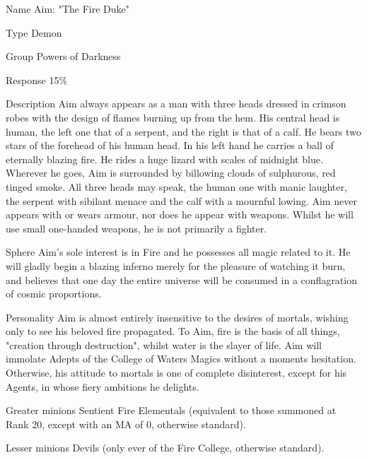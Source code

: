 \begin{example}
\begin{Description}
\item[Name] Aim: "The Fire Duke"

\item[Type] Demon

\item[Group] Powers of Darkness

\item[Response] 15\%

\item[Description] Aim always appears as a man with three heads dressed
in crimson robes with the design of flames burning up from the hem.
His central head is human, the left one that of a serpent, and the
right is that of a calf.  He bears two stars of the forehead of his
human head.  In his left hand he carries a ball of eternally blazing
fire.  He rides a huge lizard with scales of midnight blue.  Wherever
he goes, Aim is surrounded by billowing clouds of sulphurous, red
tinged smoke.  All three heads may speak, the human one with manic
laughter, the serpent with sibilant menace and the calf with a
mournful lowing.  Aim never appears with or wears armour, nor does he
appear with weapons.  Whilst he will use small one-handed weapons, he
is not primarily a fighter.

\item[Sphere] Aim's sole interest is in Fire and he possesses all magic
related to it.  He will gladly begin a blazing inferno merely for the
pleasure of watching it burn, and believes that one day the entire
universe will be consumed in a conflagration of cosmic proportions.

\item[Personality] Aim is almost entirely insensitive to the desires of
mortals, wishing only to see his beloved fire propagated.  To Aim,
fire is the basis of all things, "creation through destruction",
whilst water is the slayer of life.  Aim will immolate Adepts of the
College of Waters Magics without a moments hesitation.  Otherwise, his
attitude to mortals is one of complete disinterest, except for his
Agents, in whose fiery ambitions he delights.

\item[Greater minions] Sentient Fire Elementals (equivalent to those
summoned at Rank 20, except with an MA of 0, otherwise standard).

\item[Lesser minions] Devils (only ever of the Fire College, otherwise standard).


\end{Description}
\end{example}
